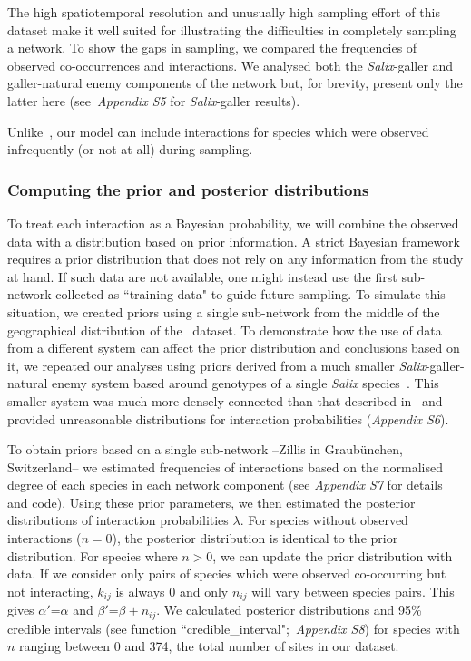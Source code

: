 \documentclass[12pt]{article}
\begin{document}
\begin{spacing}{2.0}
      The high spatiotemporal resolution and unusually high sampling effort of this dataset make it well suited for illustrating the difficulties in completely sampling a network. To show the gaps in sampling, we compared the frequencies of observed co-occurrences and interactions. We analysed both the \emph{Salix}-galler and galler-natural enemy components of the network but, for brevity, present only the latter here (see~\emph{Appendix S5} for \emph{Salix}-galler results). 


      Unlike~\citet{Bartomeus2013,Weinstein2017,Weinstein2017a}, our model can include interactions for species which were observed infrequently (or not at all) during sampling. 

    \subsubsection*{Computing the prior and posterior distributions}

        To treat each interaction as a Bayesian probability, we will combine the observed data with a distribution based on prior information. A strict Bayesian framework requires a prior distribution that does not rely on any information from the study at hand. If such data are not available, one might instead use the first sub-network collected as ``training data" to guide future sampling. To simulate this situation, we created priors using a single sub-network from the middle of the geographical distribution of the~\citet{Kopelke2017} dataset. To demonstrate how the use of data from a different system can affect the prior distribution and conclusions based on it, we repeated our analyses using priors derived from a much smaller \emph{Salix}-galler-natural enemy system based around genotypes of a single \emph{Salix} species~\citep[Data available from the Dryad Digital Repository: https://doi.org/10.5061/dryad.g7805]{Barbour2016}\nocite{Barbour2016Dryad}. This smaller system was much more densely-connected than that described in~\citet{Kopelke2017} and provided unreasonable distributions for interaction probabilities (\emph{Appendix S6}). 


        To obtain priors based on a single sub-network --Zillis in Graub\"{u}nchen, Switzerland-- we estimated frequencies of interactions based on the normalised degree of each species in each network component (see \emph{Appendix S7} for details and code). Using these prior parameters, we then estimated the posterior distributions of interaction probabilities $\lambda$. For species without observed interactions ($n = 0$), the posterior distribution is identical to the prior distribution. For species where $n>0$, we can update the prior distribution with data. If we consider only pairs of species which were observed co-occurring but not interacting, $k_{ij}$ is always 0 and only $n_{ij}$ will vary between species pairs. This gives $\alpha'$=$\alpha$ and $\beta'$=$\beta + n_{ij}$. We calculated posterior distributions and 95\% credible intervals (see function ``credible\_interval";~\emph{Appendix S8}) for species with $n$ ranging between 0 and 374, the total number of sites in our dataset. 



\end{spacing}
\end{document}

